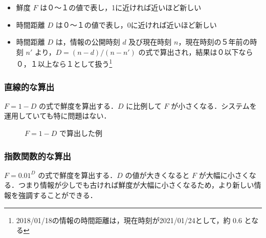 \begin{itemize}
  \item 鮮度 $F$ は０～１の値で表し，1に近ければ近いほど新しい
  \item 時間距離 $D$ は０～１の値で表し，0に近ければ近いほど新しい
  \item 時間距離 $D$ は，情報の公開時刻 $d$ 及び現在時刻 $n$，現在時刻の５年前の時刻 $n'$ より，$ D =  (n - d) / (n - n') $ の式で算出され，結果は０以下なら０，１以上なら１として扱う\footnote{2018/01/18の情報の時間距離は，現在時刻が2021/01/24として，約 0.6 となる}
\end{itemize}

\subsubsection{直線的な算出}

$ F = 1 - D $ の式で鮮度を算出する．$D$ に比例して $F$ が小さくなる．システムを運用していても特に問題はない．

\begin{figure}[htbp]
  \begin{center}
  \end{center}
  \caption{$ F = 1 - D $ で算出した例}
\end{figure}

\subsubsection{指数関数的な算出}

$ F =  0.01 ^ D $ の式で鮮度を算出する．$D$ の値が大きくなると $F$ が大幅に小さくなる．つまり情報が少しでも古ければ鮮度が大幅に小さくなるため，より新しい情報を強調することができる．

